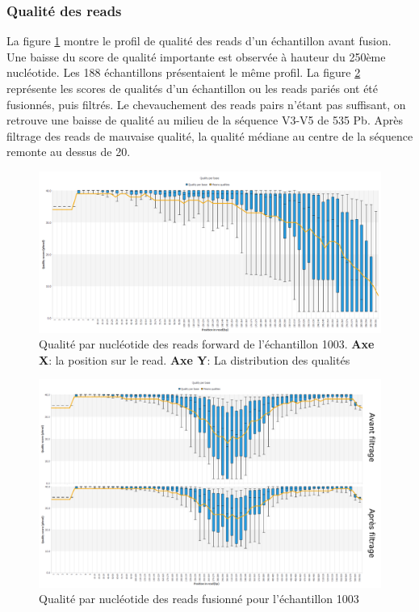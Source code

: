 \documentclass[12pt,a4paper]{article}
\begin{document}
\subsubsection{Qualité des reads}
La figure \ref{fastqt} montre le profil de qualité des reads d’un échantillon avant fusion. Une baisse du score de qualité importante est observée à hauteur du 250ème nucléotide. Les 188 échantillons présentaient le même profil.
La figure \ref{fastqt_after} représente les scores de qualités d’un échantillon ou les reads pariés ont été fusionnés, puis filtrés. Le chevauchement des reads pairs n'étant pas suffisant, on retrouve une baisse de qualité au milieu de la séquence V3-V5 de 535 Pb. Après filtrage des reads de mauvaise qualité, la qualité médiane au centre de la séquence remonte au dessus de 20.


\begin{figure}[ht]
\begin{center}
\includegraphics[scale=0.45]{img/1003_forward.png}\hfill
\end{center}
\caption{Qualité par nucléotide des reads forward de l'échantillon 1003. \textbf{Axe X}: la position sur le read. \textbf{Axe Y}: La distribution des qualités}
\label{fastqt}
\end{figure}


\begin{figure}[ht]
\begin{center}
\includegraphics[scale=0.45]{img/duo_merging.png}\hfill
\end{center}
\caption{Qualité par nucléotide des reads fusionné pour l'échantillon 1003}
\label{fastqt_after}
\end{figure}
\end{document}
